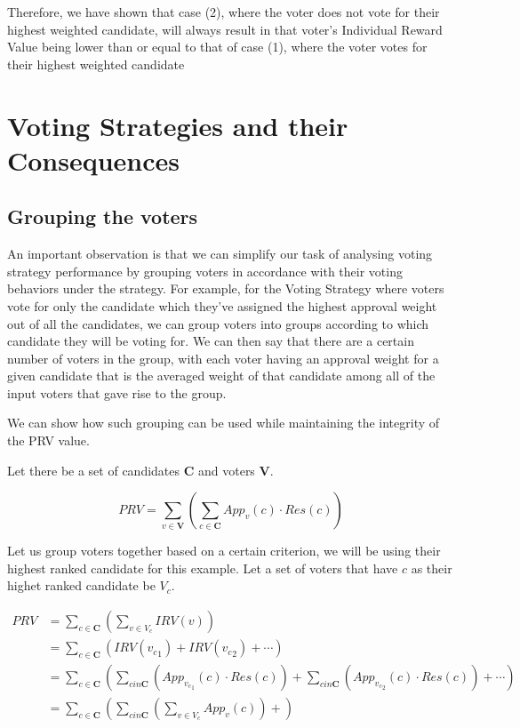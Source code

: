 \documentclass{article}
\begin{document}
Therefore, we have shown that case (2), where the voter does not vote for their highest weighted candidate, will always result in that voter's Individual Reward Value being lower than or equal to that of case (1), where the voter votes for their highest weighted candidate


\section{Voting Strategies and their Consequences}
\subsection{Grouping the voters}
An important observation is that we can simplify our task of analysing voting strategy performance by grouping voters in accordance with their voting behaviors under the strategy. For example, for the Voting Strategy where voters vote for only the candidate which they've assigned the highest approval weight out of all the candidates, we can group voters into groups according to which candidate they will be voting for. We can then say that there are a certain number of voters in the group, with each voter having an approval weight for a given candidate that is the averaged weight of that candidate among all of the input voters that gave rise to the group.

We can show how such grouping can be used while maintaining the integrity of the PRV value.

Let there be a set of candidates $\boldsymbol{C}$ and voters $\boldsymbol{V}$.

\begin{equation*}
    PRV = \sum^{}_{v \in \boldsymbol{V}}{\left(\sum^{}_{c \in \boldsymbol{C}}{{App}_v(c) \cdot {Res}(c)}\right)}
\end{equation*}

Let us group voters together based on a certain criterion, we will be using their highest ranked candidate for this example.
Let a set of voters that have $c$ as their highet ranked candidate be $V_c$.

\begin{equation*}
\begin{aligned}
PRV &= \sum^{}_{c \in \boldsymbol{C}}{\left(\sum^{}_{v \in V_c}{{IRV}(v)}\right)}\\
&= \sum^{}_{c \in \boldsymbol{C}}{\left({IRV}({v_c}_1)+{IRV}({v_c}_2)+\cdots\right)}\\
&= \sum^{}_{c \in \boldsymbol{C}}{\left(\sum^{}_{c in \boldsymbol{C}}{\left({App}_{{v_c}_1}(c)\cdot Res(c)\right)}+\sum^{}_{c in \boldsymbol{C}}{\left({App}_{{v_c}_2}(c)\cdot Res(c)\right)}+\cdots\right)}\\
&= \sum^{}_{c \in \boldsymbol{C}}{\left(\sum^{}_{c in \boldsymbol{C}}{\left(\sum^{}_{v \in V_c}{{App}_{v}(c)}\right)}+\right)}
\end{aligned}    
\end{equation*}
\end{document}
